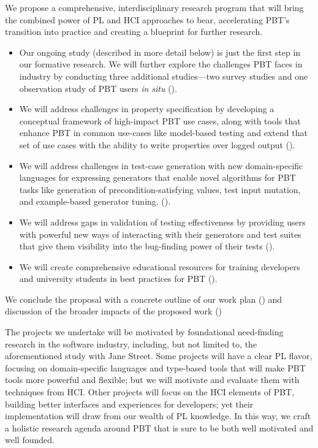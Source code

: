 We propose a comprehensive, interdisciplinary research program that
will bring the combined power of PL and HCI approaches to bear,
accelerating PBT's transition into practice\iflater{} and creating a blueprint for further research\fi.
\begin{itemize}[noitemsep]
  \item
  Our ongoing study (described in more detail below) is
  just the first step in our formative research.
  We will further explore the challenges PBT faces in
  industry by conducting three additional
  studies---two survey studies and one observation study of
  PBT users {\em in situ} ().
  \item We will address challenges in property specification by developing a
  conceptual framework of high-impact PBT use cases, along with tools that
  enhance PBT in common use-cases like model-based testing and extend that set
  of use cases with the ability to write properties over logged output
  ().
  \item We will address challenges in test-case generation with new
  domain-specific languages for expressing generators that enable novel
  algorithms for PBT tasks like generation of precondition-satisfying values,
  test input mutation, and example-based generator tuning.
  ().
  \item We will address gaps in validation of testing effectiveness by providing
  users with powerful new ways of interacting with their generators and test
  suites that give them visibility into the bug-finding power of their tests
  ().
  \item We will create comprehensive educational resources for training developers and
  university students in best practices for PBT ().
\end{itemize}
We conclude the proposal with a concrete outline of our work plan
() and discussion of the broader impacts of the
proposed work ()

\iflater{}\fi
The projects we undertake will be motivated by
foundational need-finding research in the software industry, including, but not
limited to, the aforementioned study with Jane Street. Some projects will have a
clear PL flavor, focusing on domain-specific languages and type-based tools that
will make PBT tools more powerful and flexible; but we will motivate and
evaluate them with techniques from HCI. Other projects will focus on the HCI elements
of PBT, building better interfaces and experiences for developers; yet their
implementation will draw from our wealth of PL knowledge. In this way, we craft
a holistic research agenda around PBT that is sure to be both well motivated and
well founded.

